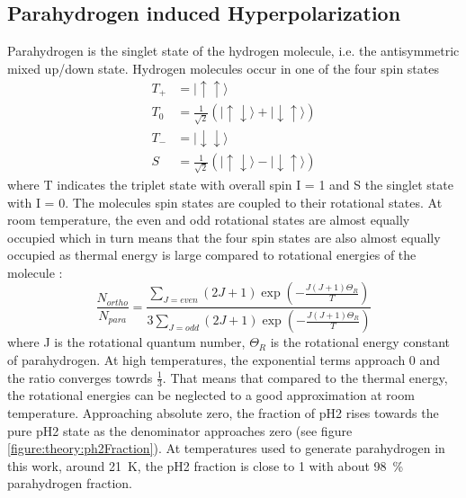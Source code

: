         \subsection{Parahydrogen induced Hyperpolarization}
            Parahydrogen is the singlet state of the hydrogen molecule, i.e. the antisymmetric mixed up/down state. Hydrogen molecules occur in one of the four spin states
            \begin{equation}
                 \begin{aligned}
                    T_+ &= |\uparrow\uparrow\rangle\\
                    T_0 &= \frac{1}{\sqrt{2}}\left(|\uparrow\downarrow\rangle + |\downarrow\uparrow\rangle\right)\\
                    T_- &= |\downarrow\downarrow\rangle\\
                    S &= \frac{1}{\sqrt{2}}\left(|\uparrow\downarrow\rangle - |\downarrow\uparrow\rangle\right)
                 \end{aligned}
            \end{equation}
            where T indicates the triplet state with overall spin I = 1 and S the singlet state with I = 0. The molecules spin states are coupled to their rotational states. At room temperature, the even and odd rotational states are almost equally occupied which in turn means that the four spin states are also almost equally occupied as thermal energy is large compared to rotational energies of the molecule \cite{green_theory_2012-1}:
            \begin{equation}
                \frac{N_{ortho}}{N_{para}} = \frac{\sum_{J=even}(2J+1)\exp\left(-\frac{J(J+1)\Theta_R}{T}\right)}{3\sum_{J=odd}\left(2J+1\right)\exp\left(-\frac{J(J+1)\Theta_R}{T}\right)}
            \end{equation}
            where J is the rotational quantum number, $\Theta_R$ is the rotational energy constant of parahydrogen\cite{noauthor_orthohydrogen_1935}. At high temperatures, the exponential terms approach 0 and the ratio converges towrds $\tfrac{1}{3}$. That means that compared to the thermal energy, the rotational energies can be neglected to a good approximation at room temperature. Approaching absolute zero, the fraction of pH2 rises towards the pure pH2 state as the denominator approaches zero (see figure \ref{figure:theory:ph2Fraction}). At temperatures used to generate parahydrogen in this work, around \SI{21}{\kelvin}, the pH2 fraction is close to 1 with about \SI{98}{\percent} parahydrogen fraction.
